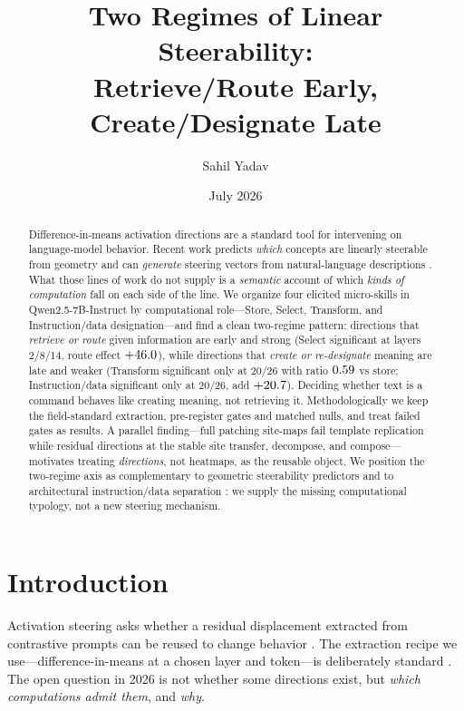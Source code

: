 \documentclass[10pt]{article}
\title{\textbf{Two Regimes of Linear Steerability:\\
Retrieve/Route Early, Create/Designate Late}}
\author{Sahil Yadav}
\date{July 2026}
\begin{document}
\maketitle

\begin{abstract}
Difference-in-means activation directions are a standard tool for intervening on
language-model behavior. Recent work predicts \emph{which} concepts are linearly
steerable from geometry
\citep{lap2026predicting,geometriccanary2026,whensteerable2026} and can
\emph{generate} steering vectors from natural-language descriptions
\citep{sun2025hypersteer}. What those lines of work do not supply is a
\emph{semantic} account of which \emph{kinds of computation} fall on each side
of the line. We organize four elicited micro-skills in Qwen2.5-7B-Instruct by
computational role---Store, Select, Transform, and Instruction/data
designation---and find a clean two-regime pattern: directions that
\emph{retrieve or route} given information are early and strong (Select
significant at layers 2/8/14, route effect $+46.0$), while
directions that \emph{create or re-designate} meaning are late and weaker
(Transform significant only at 20/26 with ratio $0.59$ vs store;
Instruction/data significant only at 20/26, add $+20.7$). Deciding
whether text is a command behaves like creating meaning, not retrieving it.
Methodologically we keep the field-standard extraction, pre-register gates and
matched nulls, and treat failed gates as results. A parallel finding---full
patching site-maps fail template replication while residual directions at the
stable site transfer, decompose, and compose---motivates treating
\emph{directions}, not heatmaps, as the reusable object. We position the
two-regime axis as complementary to geometric steerability predictors and to
architectural instruction/data separation \citep{zverev2025aside}: we supply
the missing computational typology, not a new steering mechanism.
\end{abstract}

\section{Introduction}

Activation steering asks whether a residual displacement extracted from
contrastive prompts can be reused to change behavior
\citep{turner2023steering,rimsky2024steering,todd2024function,zou2023representation}.
The extraction recipe we use---difference-in-means at a chosen layer and
token---is deliberately standard
\citep{arditi2024refusal,todd2024function}. The open question in 2026 is not
whether some directions exist, but \emph{which computations admit them}, and
\emph{why}.
\end{document}
